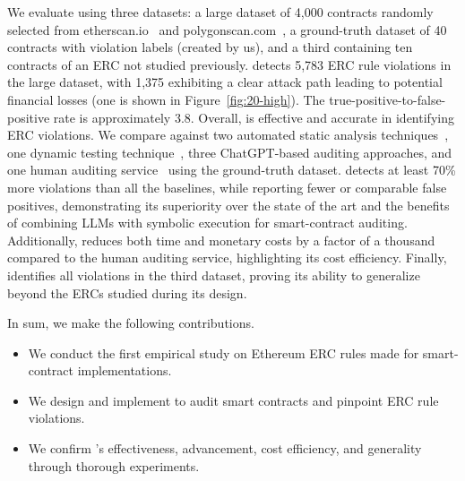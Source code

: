 \fi


We evaluate \Tool{} using three datasets: 
a large dataset of 4,000 contracts randomly selected from etherscan.io~\cite{etherscan} and polygonscan.com~\cite{polygonscan}, 
a ground-truth dataset of 40 contracts with violation 
labels (created by us), and a third containing ten contracts of 
an ERC not studied previously.
%
\Tool{} detects 5,783 ERC rule violations in the large dataset, 
with 1,375 exhibiting a clear attack path 
leading to potential financial losses (one is shown in Figure~\ref{fig:20-high}). 
The true-positive-to-false-positive rate is approximately 3.8. 
Overall, \Tool{} is effective and accurate in identifying ERC violations.
%
We compare \Tool{} against two automated static analysis techniques~\cite{slither-erc,ZepScope}, 
one dynamic testing technique~\cite{ERCx}, 
three ChatGPT-based auditing approaches, 
and one human auditing service~\cite{humanaudited} using the ground-truth dataset. 
\Tool{} detects at least 70\% more violations than all the baselines, 
while reporting fewer or comparable false positives, 
demonstrating its superiority
over the state of the art and 
the benefits of combining LLMs with symbolic execution 
for smart-contract auditing. Additionally, \Tool{} reduces both time and monetary 
costs by a factor of a thousand compared to the human auditing service, 
highlighting its cost efficiency.
%
Finally, \Tool{} identifies all violations in the third dataset, proving its ability to generalize beyond the ERCs studied during its design.

In sum, we make the following contributions. 






\begin{itemize}[leftmargin=3em]
    \item We conduct the first empirical study on Ethereum ERC rules made for smart-contract implementations.
    
    \item We design and implement \Tool to audit smart contracts and pinpoint ERC rule violations. 
    
    \item We confirm \Tool{}'s effectiveness, advancement, cost efficiency, and generality through thorough experiments.

\end{itemize}


